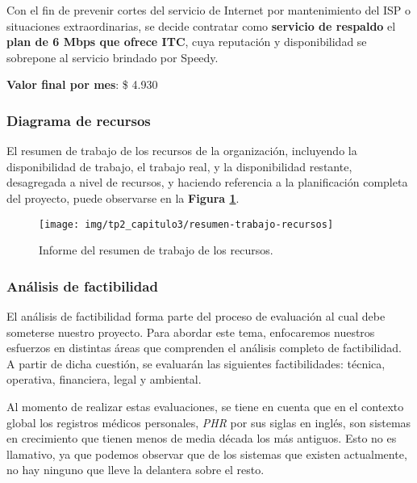 Con el fin de prevenir cortes del servicio de Internet por mantenimiento del ISP o situaciones extraordinarias, se decide contratar como \textbf{servicio de respaldo} el \textbf{plan de 6 Mbps que ofrece ITC}, cuya reputación y disponibilidad se sobrepone al servicio brindado por Speedy.

\textbf{Valor final por mes}: \$ 4.930



\subsubsection{Diagrama de recursos}

El resumen de trabajo de los recursos de la organización, incluyendo la disponibilidad de trabajo, el trabajo real, y la disponibilidad restante, desagregada a nivel de recursos, y haciendo referencia a la planificación completa del proyecto, puede observarse en la \textbf{Figura \ref{resumen-trabajo-recursos}}.

\begin{figure}
    \centering
    \texttt{[image: img/tp2\_capitulo3/resumen-trabajo-recursos]}
    \caption{Informe del resumen de trabajo de los recursos.}
    \label{resumen-trabajo-recursos}
\end{figure}

\subsubsection{Análisis de factibilidad}

El análisis de factibilidad forma parte del proceso de evaluación al cual debe someterse nuestro proyecto.
Para abordar este tema, enfocaremos nuestros esfuerzos en distintas áreas que comprenden el análisis completo de factibilidad. %
A partir de dicha cuestión, se evaluarán las siguientes factibilidades: técnica, operativa, financiera, legal y ambiental.

Al momento de realizar estas evaluaciones, se tiene en cuenta que en el contexto global los registros médicos personales, \textit{PHR} por sus siglas en inglés, son sistemas en crecimiento que tienen menos de media década los más antiguos.
Esto no es llamativo, ya que podemos observar que de los sistemas que existen actualmente, no hay ninguno que lleve la delantera sobre el resto.


